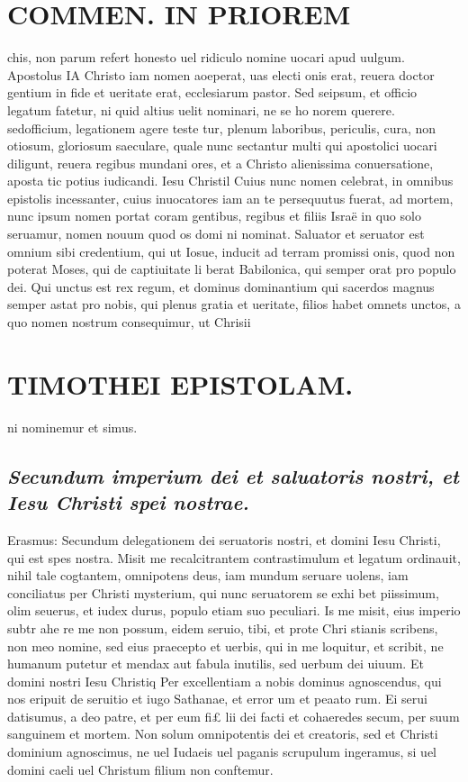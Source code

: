 \documentclass{article}
\begin{document}
\begin{pages}
\section*{COMMEN. IN PRIOREM }
\marginpar{[ p.4 ]}\pstart chis, non parum refert honesto uel ridiculo nomine uocari apud uulgum.  \pend\pstart Apostolus IA Christo iam nomen aoeperat, uas electi onis erat, reuera doctor gentium in fide et ueritate erat, ecclesiarum pastor. Sed seipsum, et officio legatum fatetur, ni quid altius uelit nominari, ne se ho norem querere. sedofficium, legationem agere teste tur, plenum laboribus, periculis, cura, non otiosum, gloriosum saeculare, quale nunc sectantur multi qui apostolici uocari diligunt, reuera regibus mundani ores, et a Christo alienissima conuersatione, aposta tic potius iudicandi.  \pend\pstart Iesu Christil Cuius nunc nomen celebrat, in omnibus epistolis incessanter, cuius inuocatores iam an te persequutus fuerat, ad mortem, nunc ipsum nomen portat coram gentibus, regibus et filiis Israë in quo solo seruamur, nomen nouum quod os domi ni nominat. Saluator et seruator est omnium sibi credentium, qui ut Iosue, inducit ad terram promissi onis, quod non poterat Moses, qui de captiuitate li berat Babilonica, qui semper orat pro populo dei. Qui unctus est rex regum, et dominus dominantium qui sacerdos magnus semper astat pro nobis, qui plenus gratia et ueritate, filios habet omnets unctos, a quo nomen nostrum consequimur, ut Chrisii  \pend
\section*{TIMOTHEI EPISTOLAM. }
\marginpar{[ p.5 ]}\pstart ni nominemur et simus.  \pend
{}
{}
\subsection*{\textit{Secundum imperium dei et saluatoris nostri, et Iesu Christi spei nostrae. }}\pstart Erasmus: Secundum delegationem dei seruatoris nostri, et domini Iesu Christi, qui est spes nostra. Misit me recalcitrantem contrastimulum et legatum ordinauit, nihil tale cogtantem, omnipotens deus, iam mundum seruare uolens, iam conciliatus per Christi mysterium, qui nunc seruatorem se exhi bet piissimum, olim seuerus, et iudex durus, populo etiam suo peculiari. Is me misit, eius imperio subtr ahe re me non possum, eidem seruio, tibi, et prote Chri stianis scribens, non meo nomine, sed eius praecepto et uerbis, qui in me loquitur, et scribit, ne humanum putetur et mendax aut fabula inutilis, sed uerbum dei uiuum.  \pend\pstart Et domini nostri Iesu Christiq Per excellentiam a nobis dominus agnoscendus, qui nos eripuit de seruitio et iugo Sathanae, et error um et peaato rum. Ei serui datisumus, a deo patre, et per eum fi£ lii dei facti et cohaeredes secum, per suum sanguinem et mortem. Non solum omnipotentis dei et creatoris, sed et Christi dominium agnoscimus, ne uel Iudaeis uel paganis scrupulum ingeramus, si uel domini caeli uel Christum filium non conftemur.  \pend

\end{pages}
\end{document}

